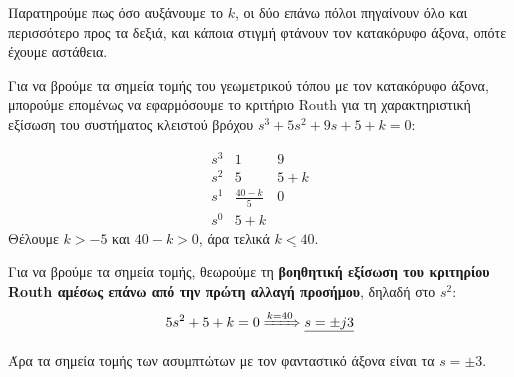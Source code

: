 \documentclass[11pt,a4paper,notitlepage,fleqn,final]{article}
\begin{document}
\begin{exercise}
	
	Παρατηρούμε πως όσο αυξάνουμε το \( k \), οι δύο επάνω πόλοι πηγαίνουν όλο και περισσότερο
	προς τα δεξιά, και κάποια στιγμή φτάνουν τον κατακόρυφο άξονα, οπότε έχουμε αστάθεια.
	
	Για να βρούμε τα σημεία τομής του γεωμετρικού τόπου με τον κατακόρυφο άξονα, μπορούμε επομένως
	να εφαρμόσουμε το κριτήριο Routh για τη χαρακτηριστική εξίσωση του συστήματος κλειστού
	βρόχου \(  s^3+5s^2+9s+5+k = 0 \):
	
	\[
	\begin{array}{r|cc}
	s^3&1&9\\
	s^2&5&5+k\\
	s^1&\frac{40-k}{5}&0\\
	s^0&5+k
	\end{array}
	\]
	Θέλουμε \( k>-5 \) και \( 40-k>0 \), άρα τελικά \( \underline{k<40} \).
	
	Για να βρούμε τα σημεία τομής, θεωρούμε τη \textbf{βοηθητική εξίσωση του κριτηρίου Routh
		αμέσως επάνω από την πρώτη αλλαγή προσήμου}, δηλαδή στο \( s^2 \):
	\[
	5s^2+5+k = 0 \xRightarrow{k=40} \underline{s= \pm j3}
	\]
	
	Άρα τα σημεία τομής των ασυμπτώτων με τον φανταστικό άξονα είναι τα \( s=\pm 3 \).

	\hspace{0pt}
\end{exercise}
\end{document}
